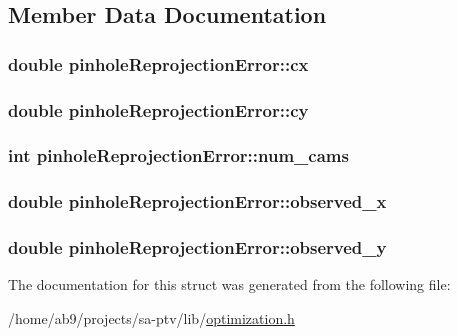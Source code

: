 \subsection{Member Data Documentation}
\hypertarget{structpinholeReprojectionError_a2f550c74a75d53ba0d1b2fc3a9c3d4c1}{
\subsubsection[{cx}]{\setlength{\rightskip}{0pt plus 5cm}double pinhole\-Reprojection\-Error\-::cx}}\label{d7/d5b/structpinholeReprojectionError_a2f550c74a75d53ba0d1b2fc3a9c3d4c1}
\hypertarget{structpinholeReprojectionError_af979ca78cb6350ffe5da1783c1344a09}{
\subsubsection[{cy}]{\setlength{\rightskip}{0pt plus 5cm}double pinhole\-Reprojection\-Error\-::cy}}\label{d7/d5b/structpinholeReprojectionError_af979ca78cb6350ffe5da1783c1344a09}
\hypertarget{structpinholeReprojectionError_aaa8f2e269d0825892f73ed4691194fba}{
\subsubsection[{num\-\_\-cams}]{\setlength{\rightskip}{0pt plus 5cm}int pinhole\-Reprojection\-Error\-::num\-\_\-cams}}\label{d7/d5b/structpinholeReprojectionError_aaa8f2e269d0825892f73ed4691194fba}
\hypertarget{structpinholeReprojectionError_adc28355ad6705458a73690c6c904d478}{
\subsubsection[{observed\-\_\-x}]{\setlength{\rightskip}{0pt plus 5cm}double pinhole\-Reprojection\-Error\-::observed\-\_\-x}}\label{d7/d5b/structpinholeReprojectionError_adc28355ad6705458a73690c6c904d478}
\hypertarget{structpinholeReprojectionError_ab1876f1f22f1648d1621dfc53046a329}{
\subsubsection[{observed\-\_\-y}]{\setlength{\rightskip}{0pt plus 5cm}double pinhole\-Reprojection\-Error\-::observed\-\_\-y}}\label{d7/d5b/structpinholeReprojectionError_ab1876f1f22f1648d1621dfc53046a329}


The documentation for this struct was generated from the following file\-:\begin{DoxyCompactItemize}
\item 
/home/ab9/projects/sa-\/ptv/lib/\hyperlink{optimization_8h}{optimization.\-h}\end{DoxyCompactItemize}
